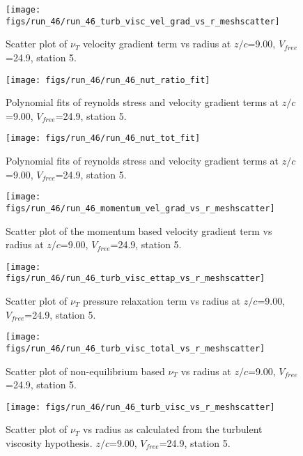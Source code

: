 \begin{figure}[H]
\centering
\texttt{[image: figs/run\_46/run\_46\_turb\_visc\_vel\_grad\_vs\_r\_meshscatter]}
\caption{Scatter plot of $\nu_T$ velocity gradient term vs radius at $z/c$=9.00, $V_{free}$=24.9, station 5.}
\end{figure}


\begin{figure}[H]
\centering
\texttt{[image: figs/run\_46/run\_46\_nut\_ratio\_fit]}
\caption{Polynomial fits of reynolds stress and velocity gradient terms at $z/c$=9.00, $V_{free}$=24.9, station 5.}
\end{figure}


\begin{figure}[H]
\centering
\texttt{[image: figs/run\_46/run\_46\_nut\_tot\_fit]}
\caption{Polynomial fits of reynolds stress and velocity gradient terms at $z/c$=9.00, $V_{free}$=24.9, station 5.}
\end{figure}


\begin{figure}[H]
\centering
\texttt{[image: figs/run\_46/run\_46\_momentum\_vel\_grad\_vs\_r\_meshscatter]}
\caption{Scatter plot of the momentum based velocity gradient term vs radius at $z/c$=9.00, $V_{free}$=24.9, station 5.}
\end{figure}


\begin{figure}[H]
\centering
\texttt{[image: figs/run\_46/run\_46\_turb\_visc\_ettap\_vs\_r\_meshscatter]}
\caption{Scatter plot of $\nu_T$ pressure relaxation term vs radius at $z/c$=9.00, $V_{free}$=24.9, station 5.}
\end{figure}


\begin{figure}[H]
\centering
\texttt{[image: figs/run\_46/run\_46\_turb\_visc\_total\_vs\_r\_meshscatter]}
\caption{Scatter plot of non-equilibrium based $\nu_T$ vs radius at $z/c$=9.00, $V_{free}$=24.9, station 5.}
\end{figure}


\begin{figure}[H]
\centering
\texttt{[image: figs/run\_46/run\_46\_turb\_visc\_vs\_r\_meshscatter]}
\caption{Scatter plot of $\nu_T$ vs radius as calculated from the turbulent viscosity hypothesis. $z/c$=9.00, $V_{free}$=24.9, station 5.}
\end{figure}


